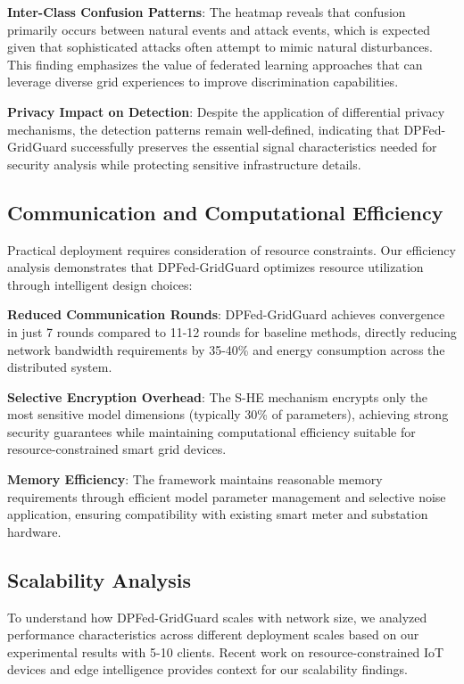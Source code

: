 \documentclass{ieeeaccess}
\theoremstyle{definition}
\begin{document}
\textbf{Inter-Class Confusion Patterns}: The heatmap reveals that confusion primarily occurs between natural events and attack events, which is expected given that sophisticated attacks often attempt to mimic natural disturbances. This finding emphasizes the value of federated learning approaches that can leverage diverse grid experiences to improve discrimination capabilities.

\textbf{Privacy Impact on Detection}: Despite the application of differential privacy mechanisms, the detection patterns remain well-defined, indicating that DPFed-GridGuard successfully preserves the essential signal characteristics needed for security analysis while protecting sensitive infrastructure details.

\subsection{Communication and Computational Efficiency}

Practical deployment requires consideration of resource constraints. Our efficiency analysis demonstrates that DPFed-GridGuard optimizes resource utilization through intelligent design choices:

\textbf{Reduced Communication Rounds}: DPFed-GridGuard achieves convergence in just 7 rounds compared to 11-12 rounds for baseline methods, directly reducing network bandwidth requirements by 35-40\% and energy consumption across the distributed system.

\textbf{Selective Encryption Overhead}: The S-HE mechanism encrypts only the most sensitive model dimensions (typically 30\% of parameters), achieving strong security guarantees while maintaining computational efficiency suitable for resource-constrained smart grid devices.

\textbf{Memory Efficiency}: The framework maintains reasonable memory requirements through efficient model parameter management and selective noise application, ensuring compatibility with existing smart meter and substation hardware.

\subsection{Scalability Analysis}

To understand how DPFed-GridGuard scales with network size, we analyzed performance characteristics across different deployment scales based on our experimental results with 5-10 clients. Recent work on resource-constrained IoT devices \cite{mohanty2024adaptive} and edge intelligence \cite{samek2025intelligent} provides context for our scalability findings.
\end{document}
